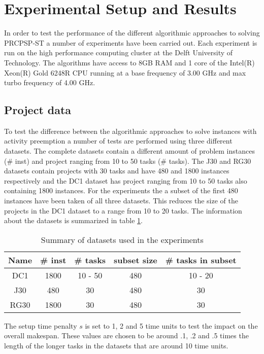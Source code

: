 \section{Experimental Setup and Results}
In order to test the performance of the different algorithmic approaches to solving PRCPSP-ST a number of experiments have been carried out.
Each experiment is run on the high performance computing cluster at the Delft University of Technology. The algorithms have access to 8GB RAM and 1 core of the Intel(R) Xeon(R) Gold 6248R CPU running at a base frequency of 3.00 GHz and max turbo frequency of 4.00 GHz.

\subsection{Project data}
To test the difference between the algorithmic approaches to solve instances with activity preemption a number of tests are performed using three different datasets. The complete datasets contain a different amount of problem instances (\# inst) and project ranging from 10 to 50 tasks (\# tasks). The J30 and RG30 datasets contain projects with 30 tasks and have 480 and 1800 instances respectively and the DC1 dataset has project ranging from 10 to 50 tasks also containing 1800 instances. For the experiments the a subset of the first 480 instances have been taken of all three datasets. This reduces the size of the projects in the DC1 dataset to a range from 10 to 20 tasks. The information about the datasets is summarized in table \ref{table:table1}.

\begin{table}
	\begin{center}
		\caption{Summary of datasets used in the experiments}
		\label{table:table1}
		\begin{tabular}{ c | c c c c }
			Name & \# inst & \# tasks & subset size & \# tasks in subset \\
			\hline
			DC1 & 1800 & 10 - 50 & 480 & 10 - 20 \\
			J30 & 480 & 30 & 480 & 30 \\
			RG30 & 1800 & 30 & 480 & 30
		\end{tabular}
	\end{center}
\end{table}

The setup time penalty \(s\) is set to 1, 2 and 5 time units to test the impact on the overall makespan. These values are chosen to be around .1, .2 and .5 times the length of the longer tasks in the datasets that are around 10 time units.

